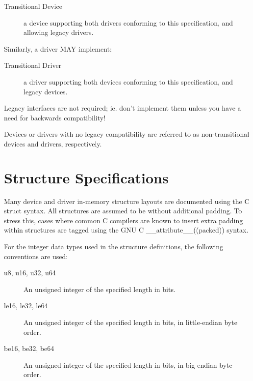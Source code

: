 \begin{description}
\item[Transitional Device]
        a device supporting both drivers conforming to this
        specification, and allowing legacy drivers.
\end{description}

Similarly, a driver MAY implement:
\begin{description}
\item[Transitional Driver]
        a driver supporting both devices conforming to this
        specification, and legacy devices.
\end{description}

\begin{note}
  Legacy interfaces are not required; ie. don't implement them unless you
  have a need for backwards compatibility!
\end{note}

Devices or drivers with no legacy compatibility are referred to as
non-transitional devices and drivers, respectively.

\section{Structure Specifications}

Many device and driver in-memory structure layouts are documented using
the C struct syntax. All structures are assumed to be without additional
padding. To stress this, cases where common C compilers are known to insert
extra padding within structures are tagged using the GNU C
__attribute__((packed))  syntax.

For the integer data types used in the structure definitions, the following
conventions are used:

\begin{description}
\item[u8, u16, u32, u64] An unsigned integer of the specified length in bits.

\item[le16, le32, le64] An unsigned integer of the specified length in bits,
in little-endian byte order.

\item[be16, be32, be64] An unsigned integer of the specified length in bits,
in big-endian byte order.
\end{description}

\newpage

